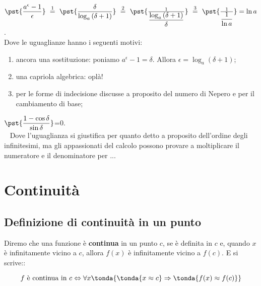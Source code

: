\begin{esempio}
\(\pst{\dfrac{a^\epsilon-1}{\epsilon}}
~ \stackrel{1}{=} ~  
\pst{\dfrac{\delta}{\log_a{(\delta+1)}}}
~ \stackrel{2}{=} ~
\pst{\frac{1}{\dfrac{\log_a{(\delta+1)}}{\delta}}}
~ \stackrel{3}{=} ~ 
\pst{\frac{1}{\dfrac{1}{\ln{a}}}}=\ln{a}\).\\

Dove le uguaglianze hanno i seguenti motivi:
\begin{enumerate} [nosep]
 \item ancora una sostituzione: poniamo
$a^\epsilon-1=\delta$. Allora $\epsilon=\log_a(\delta+1)$;
 \item una capriola algebrica: oplà! 
 \item per le forme di indecisione discusse a proposito del numero di Nepero
e per il cambiamento di base;
\end{enumerate}
\end{esempio}

\begin{esempio}
 \(\pst{\dfrac{1-\cos \delta}{\sin \delta}}\)=0.\\
~
Dove l'uguaglianza si giustifica per quanto detto a proposito dell'ordine 
degli infinitesimi, ma gli appassionati del calcolo possono provare a 
moltiplicare il numeratore e il denominatore per ...
\end{esempio}



\section{Continuità}
\label{sec:cont_continuita}

\subsection{Definizione di continuità in un punto}
\label{subsec:cont_definizione}


\begin{definizione}
Diremo che una funzione è \textbf{continua} in un punto \(c\), 
se è definita in \(c\) e, 
quando \(x\) è infinitamente vicino a \(c\), 
allora \(f(x)\) è infinitamente vicino a \(f(c)\). E si scrive::

\[f \text{ è continua in } c \Leftrightarrow 
\forall x \tonda{\tonda{x \approx c} \Rightarrow 
\tonda{f(x) \approx f(c)}}\]

\end{definizione}

